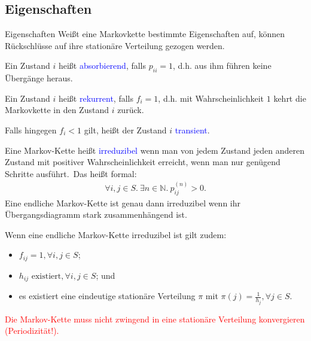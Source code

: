 \documentclass{beamer}
\def\padding{\vspace{0.5cm}}
\def\spadding{\vspace{0.25cm}}
\def\b{\textcolor{blue}}
\def\r{\textcolor{red}}
\begin{document}
\subsection{Eigenschaften}
\begin{frame}{Eigenschaften}
    Weißt eine Markovkette bestimmte Eigenschaften auf, können Rückschlüsse auf ihre stationäre Verteilung gezogen werden.\pause\par\padding
    \begin{definition}
        Ein Zustand $i$ heißt \b{absorbierend}, falls $p_{ii} = 1$, d.h. aus ihm führen keine Übergänge heraus.\pause\par\spadding
        Ein Zustand $i$ heißt \b{rekurrent}, falls $f_{i} = 1$, d.h. mit Wahrscheinlichkeit $1$ kehrt die Markovkette in den Zustand $i$ zurück.\pause\par
        Falls hingegen $f_{i} < 1$ gilt, heißt der Zustand $i$ \b{transient}.
    \end{definition}
\end{frame}

\begin{frame}
    \begin{definition}
        Eine Markov-Kette heißt \b{irreduzibel} wenn man von jedem Zustand jeden anderen Zustand mit positiver Wahrscheinlichkeit erreicht, wenn man nur genügend Schritte ausführt.\pause\ Das heißt formal:
        \begin{align*}
            \forall i, j \in S.\ \exists n \in \mathbb{N}.\ p_{ij}^{(n)} > 0.
        \end{align*}\pause
        Eine endliche Markov-Kette ist genau dann irreduzibel wenn ihr Übergangsdiagramm stark zusammenhängend ist.\pause\par\spadding
        Wenn eine endliche Markov-Kette irreduzibel ist   gilt zudem:\pause
        \begin{itemize}
            \item $f_{ij} = 1, \forall i, j \in S$\pause;
            \item $h_{ij} \text{ existiert}, \forall i, j \in S$\pause; und
            \item es existiert eine eindeutige stationäre Verteilung $\pi$ mit $\pi(j) = \frac{1}{h_{j}}, \forall j \in S$.
        \end{itemize}\pause
        \r{Die Markov-Kette muss nicht zwingend in eine stationäre Verteilung konvergieren (Periodizität!).}
    \end{definition}
\end{frame}
\end{document}
